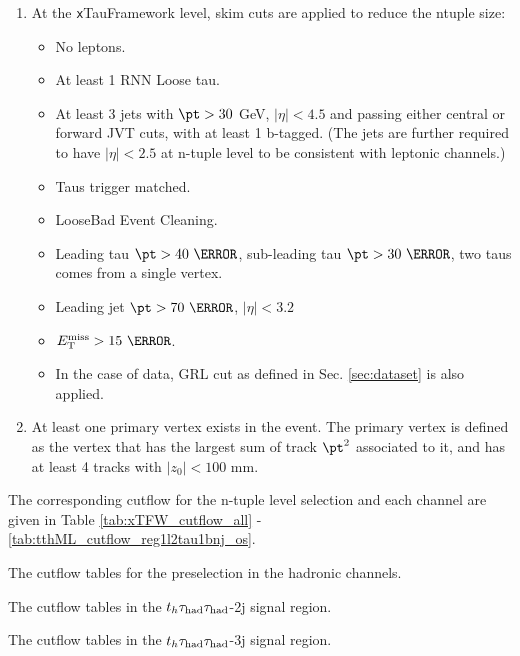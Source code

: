 \begin{enumerate}
\item At the {\texttt xTauFramework} level, skim cuts are applied to reduce the ntuple size:
  \begin{itemize}
  \item No leptons.
  \item At least 1 RNN Loose tau.
  \item At least 3 jets with $\pt>30$ GeV, $|\eta|<4.5$ and passing either central or forward JVT cuts, with at least 1 b-tagged. (The jets are further required to have $|\eta|<2.5$ at n-tuple level to be consistent with leptonic channels.)
  \item Taus trigger matched.
  \item LooseBad Event Cleaning.
  \item Leading tau $\pt>40~\GeV$, sub-leading tau $\pt>30~\GeV$, two taus comes from a single vertex.
  \item Leading jet $\pt>70~\GeV$, $|\eta|<3.2$
  \item $\met>15~\GeV$.
  \item In the case of data, GRL cut as defined in Sec. \ref{sec:dataset} is also applied.
  \end{itemize}

\item At least one primary vertex exists in the event. The primary vertex is defined as the vertex that has the largest sum of track $\pt^2$ associated to it, and has at least 4 tracks with $|z_0|<100$ mm.
\end{enumerate}

The corresponding cutflow for the n-tuple level selection and each channel are given in Table \ref{tab:xTFW_cutflow_all} - \ref{tab:tthML_cutflow_reg1l2tau1bnj_os}.
\begin{table}[H]
\caption{The cutflow tables for the preselection in the hadronic channels.}
\label{tab:xTFW_cutflow_all}
\footnotesize

\end{table}

\begin{table}[H]
\caption{The cutflow tables in the $t_h\tau_\text{had}{}\tau_\text{had}$-2j signal region.}
\label{tab:cutflow_STHhadhad}

\end{table}

\begin{table}[H]
\caption{The cutflow tables in the $t_h\tau_\text{had}{}\tau_\text{had}$-3j signal region.}
\label{tab:cutflow_TTHhadhad}

\end{table}

